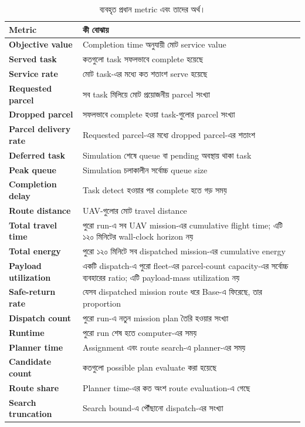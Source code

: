 \documentclass[10pt,a4paper]{article}
\begin{document}
\begin{table}[htbp]
\centering
\caption{ব্যবহৃত প্রধান metric এবং তাদের অর্থ।}
\label{tab:metrics-bn}
\begin{tabularx}{0.95\textwidth}{@{}>{\bfseries}p{}X@{}}
\toprule
Metric & কী বোঝায় \\
\midrule
Objective value & Completion time অনুযায়ী মোট service value \\
Served task & কতগুলো task সফলভাবে complete হয়েছে \\
Service rate & মোট task-এর মধ্যে কত শতাংশ serve হয়েছে \\
Requested parcel & সব task মিলিয়ে মোট প্রয়োজনীয় parcel সংখ্যা \\
Dropped parcel & সফলভাবে complete হওয়া task-গুলোর parcel সংখ্যা \\
Parcel delivery rate & Requested parcel-এর মধ্যে dropped parcel-এর শতাংশ \\
Deferred task & Simulation শেষে queue বা pending অবস্থায় থাকা task \\
Peak queue & Simulation চলাকালীন সর্বোচ্চ queue size \\
Completion delay & Task detect হওয়ার পর complete হতে গড় সময় \\
Route distance & UAV-গুলোর মোট travel distance \\
Total travel time & পুরো run-এ সব UAV mission-এর cumulative flight time; এটি ১২০ মিনিটের wall-clock horizon নয় \\
Total energy & পুরো ১২০ মিনিটে সব dispatched mission-এর cumulative energy \\
Payload utilization & একটি dispatch-এ পুরো fleet-এর parcel-count capacity-এর সর্বোচ্চ ব্যবহারের ratio; এটি payload-mass utilization নয় \\
Safe-return rate & যেসব dispatched mission route ধরে Base-এ ফিরেছে, তার proportion \\
Dispatch count & পুরো run-এ নতুন mission plan তৈরি হওয়ার সংখ্যা \\
Runtime & পুরো run শেষ হতে computer-এর সময় \\
Planner time & Assignment এবং route search-এ planner-এর সময় \\
Candidate count & কতগুলো possible plan evaluate করা হয়েছে \\
Route share & Planner time-এর কত অংশ route evaluation-এ গেছে \\
Search truncation & Search bound-এ পৌঁছানো dispatch-এর সংখ্যা \\
\bottomrule
\end{tabularx}
\end{table}
\end{document}
